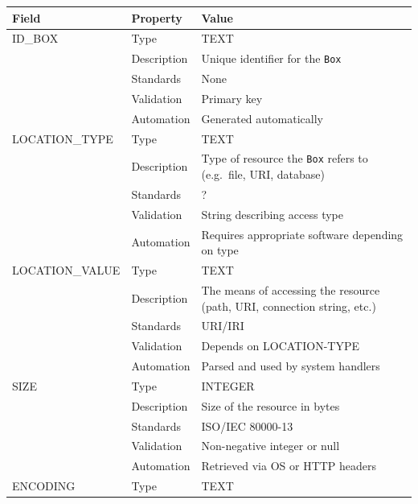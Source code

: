 \documentclass[
]{article}
\newcounter{none}
\begin{document}
{\def\LTcaptype{none} 
\begin{longtable}[]{@{}
  >{\raggedright\arraybackslash}p{}
  >{\raggedright\arraybackslash}p{}
  >{\raggedright\arraybackslash}p{}@{}}
\toprule\noalign{}
\begin{minipage}[b]{\linewidth}\raggedright
Field
\end{minipage} & \begin{minipage}[b]{\linewidth}\raggedright
Property
\end{minipage} & \begin{minipage}[b]{\linewidth}\raggedright
Value
\end{minipage} \\
\midrule\noalign{}
\endhead
\bottomrule\noalign{}
\endlastfoot
ID\_BOX & Type & TEXT \\
& Description & Unique identifier for the \texttt{Box} \\
& Standards & None \\
& Validation & Primary key \\
& Automation & Generated automatically \\
LOCATION\_TYPE & Type & TEXT \\
& Description & Type of resource the \texttt{Box} refers to (e.g.~file,
URI, database) \\
& Standards & ? \\
& Validation & String describing access type \\
& Automation & Requires appropriate software depending on type \\
LOCATION\_VALUE & Type & TEXT \\
& Description & The means of accessing the resource (path, URI,
connection string, etc.) \\
& Standards & URI/IRI \\
& Validation & Depends on LOCATION-TYPE \\
& Automation & Parsed and used by system handlers \\
SIZE & Type & INTEGER \\
& Description & Size of the resource in bytes \\
& Standards & ISO/IEC 80000-13 \\
& Validation & Non-negative integer or null \\
& Automation & Retrieved via OS or HTTP headers \\
ENCODING & Type & TEXT \\

\end{longtable}}
\end{document}
